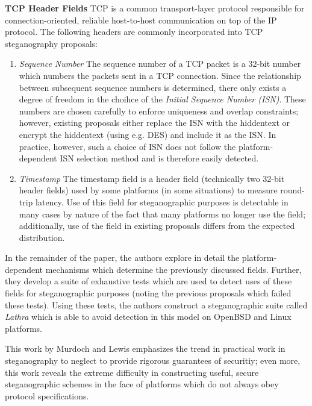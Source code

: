 \documentclass{article}
\begin{document}
\noindent \textbf{TCP Header Fields } TCP is a common transport-layer protocol responsible for connection-oriented, reliable host-to-host communication 
on top of the IP protocol.  The following headers are commonly incorporated into TCP steganography proposals:
\begin{enumerate}
\item{\textit{Sequence Number } The sequence number of a TCP packet is a 32-bit number which numbers the packets sent in a TCP 
connection.  Since the relationship between subsequent sequence numbers is determined, there only exists a degree of freedom in the 
choihce of the \textit{Initial Sequence Number (ISN)}.  These numbers are chosen carefully to enforce uniqueness and overlap 
constraints; however, existing proposals either replace the ISN with the hiddentext or encrypt the hiddentext (using e.g. DES) and 
include it as the ISN.  In practice, however, such a choice of ISN does not follow the platform-dependent ISN selection method and 
is therefore easily detected.}
\item{\textit{Timestamp } The timestamp field is a header field (technically two 32-bit header fields) used by some platforms (in some situations) to 
measure round-trip latency.  Use of this field for steganographic purposes is detectable in many cases by nature of the fact that many platforms 
no longer use the field; additionally, use of the field in existing proposals differs from the expected distribution.}
\end{enumerate}

In the remainder of the paper, the authors explore in detail the platform-dependent mechanisms which determine the previously 
discussed fields.  Further, they develop a suite of exhaustive tests which are used to detect uses of these fields for steganographic purposes 
(noting the previous proposals which failed these tests).  Using these tests, the authors construct a steganographic suite 
called \textit{Lathra} which is able to avoid detection in this model on OpenBSD and Linux platforms.  
\newline\newline

This work by Murdoch and Lewis emphasizes the trend in practical work in steganography to neglect to provide rigorous 
guarantees of securitiy; even more, this work reveals the extreme difficulty in constructing useful, secure steganographic 
schemes in the face of platforms which do not always obey protocol specifications.
\end{document}
